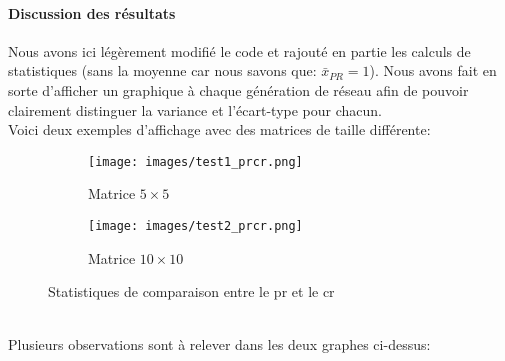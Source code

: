 \documentclass[12pt,twoside, openright]{memoir}
\begin{document}
	\paragraph*{Discussion des résultats} Nous avons ici légèrement modifié le code et rajouté en partie les calculs de statistiques (sans la moyenne car nous savons que: $\bar{x}_{PR}=1$). Nous avons fait en sorte d'afficher un graphique à chaque génération de réseau afin de pouvoir clairement distinguer la variance et l'écart-type pour chacun.\\
	Voici deux exemples d'affichage avec des matrices de taille différente:
	\begin{figure}[ht]
		\begin{subfigure}[b]{.5\linewidth}
			\centering
			\texttt{[image: images/test1\_prcr.png]} 
			\caption{Matrice $5\times 5$} 
			\label{stats:55}
		\end{subfigure}%
		\begin{subfigure}[b]{.5\linewidth}
			\centering
			\texttt{[image: images/test2\_prcr.png]} 
			\caption{Matrice $10\times 10$} 
			\label{stats:1010}
		\end{subfigure}
		\caption{Statistiques de comparaison entre le \gls{pr} et le \gls{cr}}
		\label{stats}
	\end{figure}\\
	Plusieurs observations sont à relever dans les deux graphes ci-dessus:
\end{document}
